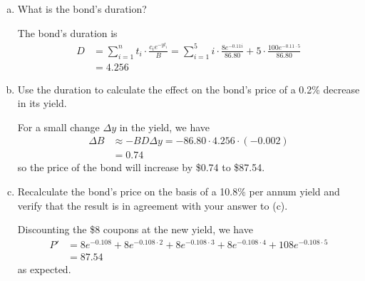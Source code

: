 \documentclass{article}
\begin{document}
\begin{itemize}
\begin{enumerate}[(a)]
			\item What is the bond's duration?
				\begin{soln}
					The bond's duration is
					\begin{align*}
						D &= \sum_{i=1}^{n} t_i\cdot \frac{c_i e^{-yt_i}}{B} = \sum_{i=1}^{5} i\cdot \frac{8e^{-0.11i}}{86.80} + 5\cdot \frac{100e^{-0.11\cdot 5}}{86.80} \\
						&= 4.256
					\end{align*}
				\end{soln}

			\item Use the duration to calculate the effect on the bond's price of a 0.2\% decrease in its yield.
				\begin{soln}
					For a small change $\Delta y$ in the yield, we have
					\begin{align*}
						\Delta B &\approx -BD\Delta y = -86.80\cdot 4.256\cdot (-0.002) \\
						&= 0.74
					\end{align*}
					so the price of the bond will increase by \$0.74 to \$87.54.
				\end{soln}

			\item Recalculate the bond's price on the basis of a 10.8\% per annum yield and verify that the result is in agreement with your answer to (c).
				\begin{soln}
					Discounting the \$8 coupons at the new yield, we have
					\begin{align*}
						P' &= 8e^{-0.108}+8e^{-0.108\cdot 2} + 8e^{-0.108\cdot 3}+8e^{-0.108\cdot 4}+108e^{-0.108\cdot5} \\
						&= 87.54
					\end{align*}
					as expected.
				\end{soln}
				
		\end{enumerate}


\end{itemize}
\end{document}
